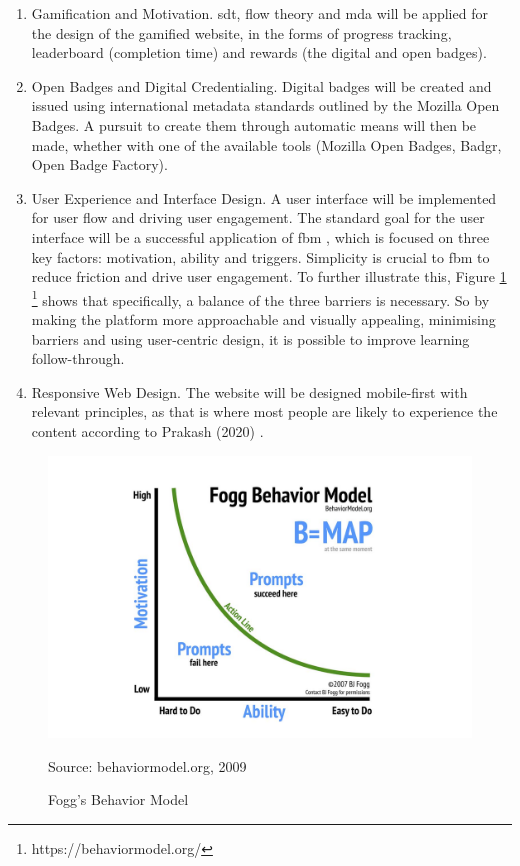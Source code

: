 \begin{enumerate}
  \addtolength{\itemsep}{-0.5\baselineskip} 
  \item {Gamification and Motivation.} \acrshort{sdt}, flow theory and \acrshort{mda} will be applied for the design of the gamified website, in the forms of progress tracking, leaderboard (completion time) and rewards (the digital and open badges)\cite{sdt}\cite{flow}.
  \item {Open Badges and Digital Credentialing.} Digital badges will be created and issued using international metadata standards outlined by the Mozilla Open Badges. 
  A pursuit to create them through automatic means will then be made, whether with one of the available tools (Mozilla Open Badges, Badgr, Open Badge Factory).
  \item {User Experience and Interface Design.} A user interface will be implemented for user flow and driving user engagement. 
  The standard goal for the user interface will be a successful application of \acrshort{fbm} \cite{fogg}, which is focused on three key factors: motivation, ability and triggers. 
  Simplicity is crucial to \acrshort{fbm}  to reduce friction and drive user engagement. 
  To further illustrate this, Figure \ref{fig:foggChart} \footnote{https://behaviormodel.org/} shows that specifically, a balance of the three barriers is necessary. 
  So by making the platform more approachable and visually appealing, minimising barriers and using user-centric design, it is possible to improve learning follow-through.
  \item {Responsive Web Design.} The website will be designed mobile-first with relevant principles, as that is where most people are likely to experience the content according to Prakash (2020) \cite{mobileDesign}. 
\end{enumerate}

\begin{figure}[htbp]
 \centering
 \includegraphics[width=14cm]{Media/Fogg-Behavior-Model.jpg}
 \caption{Fogg's Behavior Model}
 \label{fig:foggChart}
 {\raggedright \small{Source:} behaviormodel.org, 2009\par}
\end{figure}

